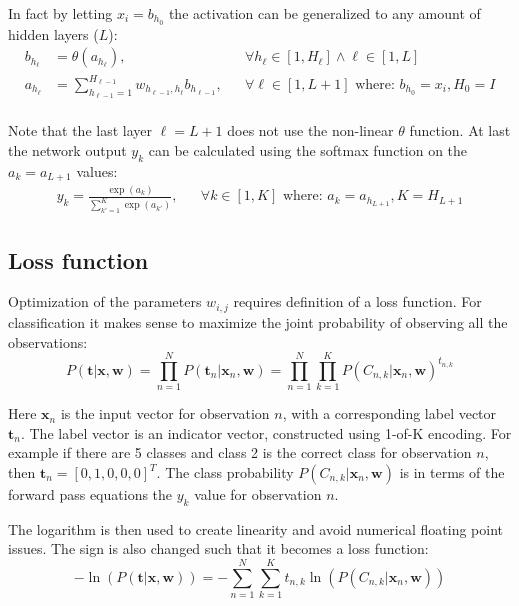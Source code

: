 In fact by letting $x_i = b_{h_0}$ the activation can be generalized to any amount of hidden layers ($L$):
\begin{equation}
\begin{aligned}
b_{h_\ell} &= \theta(a_{h_\ell}), && \forall h_{\ell} \in [1, H_{\ell}] \wedge \ell \in [1, L] \\
a_{h_\ell} &= \sum_{h_{\ell-1} = 1}^{H_{\ell-1}} w_{h_{\ell-1}, h_{\ell}} b_{h_{\ell-1}}, && \forall \ell \in [1, L+1] \text{ where: } b_{h_0} = x_i, H_0 = I \\
\end{aligned}
\end{equation}

Note that the last layer $\ell = L + 1$ does not use the non-linear $\theta$ function. 
At last the network output $y_k$ can be calculated using the softmax function on the $a_k = a_{L+1}$ values:
\begin{equation}
\begin{aligned}
y_k = \frac{\exp(a_k)}{\sum_{k'=1}^K \exp(a_{k'})}, && \forall k \in [1, K] \text{ where: } a_k=a_{h_{L+1}}, K = H_{L + 1}
\end{aligned}
\label{eq:theory:ffnn:y}
\end{equation}

\subsection{Loss function}

Optimization of the parameters $w_{i,j}$ requires definition of a loss function. For classification it makes sense to maximize the joint probability of observing all the observations:
\begin{equation}
P(\mathbf{t} | \mathbf{x}, \mathbf{w}) = \prod_{n=1}^N P(\mathbf{t}_n | \mathbf{x}_n, \mathbf{w})  = \prod_{n=1}^N \prod_{k=1}^K P(C_{n, k} | \mathbf{x}_n, \mathbf{w})^{t_{n, k}}
\end{equation}

Here $\mathbf{x}_{n}$ is the input vector for observation $n$, with a corresponding label vector $\mathbf{t}_n$. The label vector is an indicator vector, constructed using 1-of-K encoding. For example if there are 5 classes and class 2 is the correct class for observation $n$, then $\mathbf{t}_n = [0, 1, 0, 0, 0]^T$. The class probability $P(C_{n, k} | \mathbf{x}_n, \mathbf{w})$ is in terms of the forward pass equations the $y_k$ value for observation $n$.

The logarithm is then used to create linearity and avoid numerical floating point issues. The sign is also changed such that it becomes a loss function:
\begin{equation}
- \ln\left(P(\mathbf{t} | \mathbf{x}, \mathbf{w})\right) = - \sum_{n=1}^N \sum_{k=1}^K t_{n, k} \ln\left( P(C_{n, k} | \mathbf{x}_n, \mathbf{w})\right)
\label{eq:theory:ffnn:long-loss}
\end{equation}

